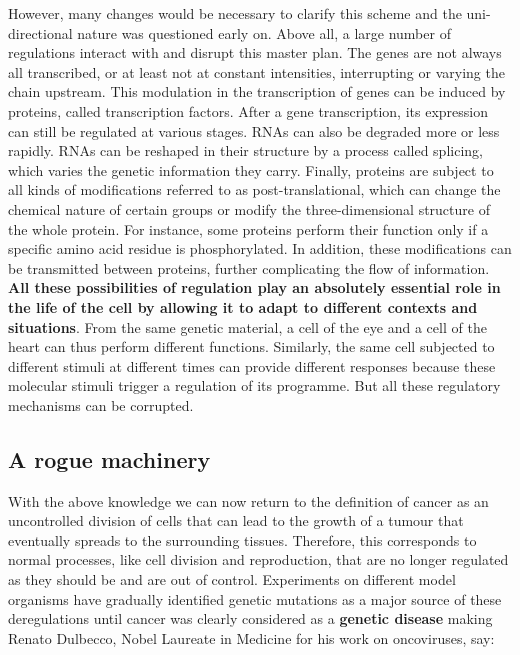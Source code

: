 \documentclass[a4paper,12pt,twoside,onecolumn,openright,final,oldfontcommands]{memoir}
\begin{document}
However, many changes would be necessary to clarify this scheme and the
uni-directional nature was questioned early on. Above all, a large
number of regulations interact with and disrupt this master plan. The
genes are not always all transcribed, or at least not at constant
intensities, interrupting or varying the chain upstream. This modulation
in the transcription of genes can be induced by proteins, called
transcription factors. After a gene transcription, its expression can
still be regulated at various stages. RNAs can also be degraded more or
less rapidly. RNAs can be reshaped in their structure by a process
called splicing, which varies the genetic information they carry.
Finally, proteins are subject to all kinds of modifications referred to
as post-translational, which can change the chemical nature of certain
groups or modify the three-dimensional structure of the whole protein.
For instance, some proteins perform their function only if a specific
amino acid residue is phosphorylated. In addition, these modifications
can be transmitted between proteins, further complicating the flow of
information. \textbf{All these possibilities of regulation play an
absolutely essential role in the life of the cell by allowing it to
adapt to different contexts and situations}. From the same genetic
material, a cell of the eye and a cell of the heart can thus perform
different functions. Similarly, the same cell subjected to different
stimuli at different times can provide different responses because these
molecular stimuli trigger a regulation of its programme. But all these
regulatory mechanisms can be corrupted.

\subsection{A rogue machinery}\label{a-rogue-machinery}

With the above knowledge we can now return to the definition of cancer
as an uncontrolled division of cells that can lead to the growth of a
tumour that eventually spreads to the surrounding tissues. Therefore,
this corresponds to normal processes, like cell division and
reproduction, that are no longer regulated as they should be and are out
of control. Experiments on different model organisms have gradually
identified genetic mutations as a major source of these deregulations
\citep[\citet{reddy1982point}]{nowell1976clonal} until cancer was
clearly considered as a \textbf{genetic disease} making Renato Dulbecco,
Nobel Laureate in Medicine for his work on oncoviruses, say:
\end{document}
